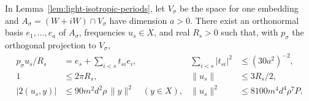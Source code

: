 \begin{auxlemma}
\label{lem:light-triangular-frequencies}
In Lemma~\ref{lem:light-isotropic-periods}, let \(V_\sigma\) be
the space for one embedding and \(A_\sigma=(W+iW)\cap V_\sigma\)
have dimension \(a>0\). There exist an orthonormal basis
\(e_1,\ldots,e_a\) of \(A_\sigma\), frequencies \(u_s\in X\),
and real \(R_s>0\) such that, with \(p_\sigma\) the orthogonal
projection to \(V_\sigma\),
\begin{align}
 p_\sigma u_s/R_s &=e_s+\sum_{i<s}t_{si}e_i,
 &\sum_{i<s}|t_{si}|^2&\le (30a^2)^{-2},\label{eq:light-triangular-projection}\\
 1&\le2\pi R_s, & \|u_s\|&\le 3R_s/2,\nonumber\\
 |2(u_s,y)|&\le 90m^2d^2\rho\,\|y\|^2\quad(y\in X),
 &\|u_s\|^2&\le 8100m^4d^4\rho^7 P.\label{eq:light-frequency-cost}
\end{align}
\end{auxlemma}
